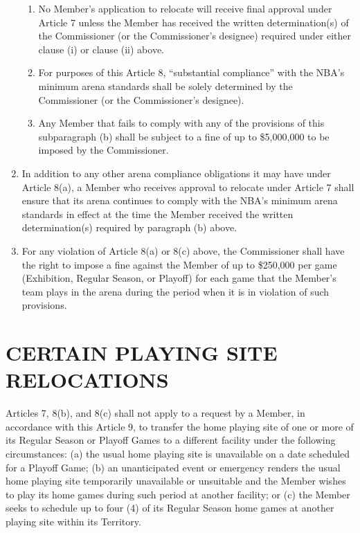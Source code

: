 \documentclass[]{book}
\theoremstyle{definition}
\theoremstyle{definition}
\theoremstyle{definition}
\theoremstyle{remark}
\begin{document}
\begin{enumerate}
\begin{enumerate}
  \item
    No Member's application to relocate will receive final approval
    under Article 7 unless the Member has received the written
    determination(s) of the Commissioner (or the Commissioner's
    designee) required under either clause (i) or clause (ii) above.
  \item
    For purposes of this Article 8, ``substantial compliance'' with the
    NBA's minimum arena standards shall be solely determined by the
    Commissioner (or the Commissioner's designee).
  \item
    Any Member that fails to comply with any of the provisions of this
    subparagraph (b) shall be subject to a fine of up to \$5,000,000 to
    be imposed by the Commissioner.
  \end{enumerate}
\item
  In addition to any other arena compliance obligations it may have
  under Article 8(a), a Member who receives approval to relocate under
  Article 7 shall ensure that its arena continues to comply with the
  NBA's minimum arena standards in effect at the time the Member
  received the written determination(s) required by paragraph (b) above.
\item
  For any violation of Article 8(a) or 8(c) above, the Commissioner
  shall have the right to impose a fine against the Member of up to
  \$250,000 per game (Exhibition, Regular Season, or Playoff) for each
  game that the Member's team plays in the arena during the period when
  it is in violation of such provisions.
\end{enumerate}

\section{CERTAIN PLAYING SITE
RELOCATIONS}\label{certain-playing-site-relocations}

Articles 7, 8(b), and 8(c) shall not apply to a request by a Member, in
accordance with this Article 9, to transfer the home playing site of one
or more of its Regular Season or Playoff Games to a different facility
under the following circumstances: (a) the usual home playing site is
unavailable on a date scheduled for a Playoff Game; (b) an unanticipated
event or emergency renders the usual home playing site temporarily
unavailable or unsuitable and the Member wishes to play its home games
during such period at another facility; or (c) the Member seeks to
schedule up to four (4) of its Regular Season home games at another
playing site within its Territory.
\end{document}
